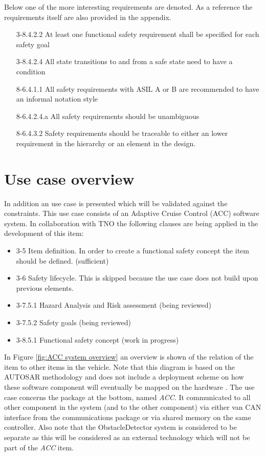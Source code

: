 \documentclass[a4paper]{article}
\begin{document}
Below one of the more interesting requirements are denoted.
As a reference the requirements itself are also provided in the appendix.
\begin{itemize}
\item[3-8.4.2.2] At least one functional safety requirement shall be specified for each safety goal
\item[3-8.4.2.4] All state transitions to and from a safe state need to have a condition
\item[8-6.4.1.1] All safety requirements with ASIL A or B are recommended to have an informal notation style
\item[8-6.4.2.4.a] All safety requirements should be unambiguous
\item[8-6.4.3.2] Safety requirements should be traceable to either an lower requirement in the hierarchy or an element in the design.
\end{itemize}

\section{Use case overview}
In addition an use case is presented which will be validated against the constraints.
This use case consists of an Adaptive Cruise Control (ACC) software system.
In collaboration with TNO the following clauses are being applied in the development of this item:
\begin{itemize}
\item 3-5 Item definition. In order to create a functional safety concept the item should be defined. (sufficient)
\item 3-6 Safety lifecycle. This is skipped because the use case does not build upon previous elements.
\item 3-7.5.1 Hazard Analysis and Risk assessment (being reviewed)
\item 3-7.5.2 Safety goals (being reviewed)
\item 3-8.5.1 Functional safety concept (work in progress)
\end{itemize}

In Figure \ref{fig:ACC system overview} an overview is shown of the relation of the item to other items in the vehicle.
Note that this diagram is based on the AUTOSAR methodology and does not include a deployment scheme on how these software component will eventually be mapped on the hardware \cite{Briciu2013}.
The use case concerns the package at the bottom, named \textit{ACC}.
It communicated to all other component in the system (and to the other component) via either van CAN interface from the communications package or via shared memory on the same controller.
Also note that the ObstacleDetector system is considered to be separate as this will be considered as an external technology which will not be part of the \textit{ACC} item.
\end{document}
